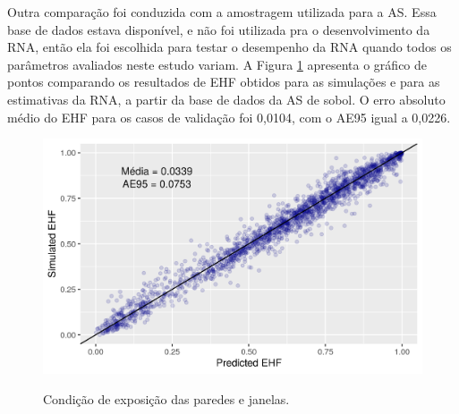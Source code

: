 \documentclass[brazil,hardcopy,openany,a4paper]{ufscthesis}
\begin{document}
	Outra comparação foi conduzida com a amostragem utilizada para a AS. Essa base de dados estava disponível, e não foi utilizada pra o desenvolvimento da RNA, então ela foi escolhida para testar o desempenho da RNA quando todos os parâmetros avaliados neste estudo variam. A Figura \ref{fig:ann_sobol} apresenta o gráfico de pontos comparando os resultados de EHF obtidos para as simulações e para as estimativas da RNA, a partir da base de dados da AS de sobol. O erro absoluto médio do EHF para os casos de validação foi 0,0104, com o AE95 igual a 0,0226.
	
	\begin{figure}[H]
		\centering
		\caption{Condição de exposição das paredes e janelas.}
		\includegraphics[width=1\linewidth]{img/ann_test.png}
		\label{fig:ann_sobol}
	\end{figure}
	
	


	
\end{document}
